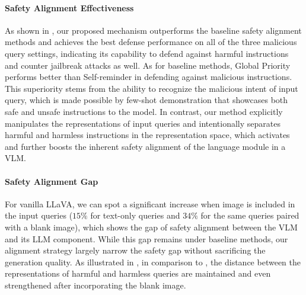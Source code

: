 \paragraph{Safety Alignment Effectiveness}
As shown in , our proposed \MODEL mechanism outperforms the baseline safety alignment methods and achieves the best defense performance on all of the three malicious query settings, indicating its capability to defend against harmful instructions and counter jailbreak attacks as well. 
As for baseline methods, Global Priority performs better than Self-reminder in defending against malicious instructions. This superiority stems from the ability to recognize the malicious intent of input query, which is made possible by few-shot demonstration that showcases both safe and unsafe instructions to the model. 
In contrast, our method explicitly manipulates the representations of input queries and intentionally separates harmful and harmless instructions in the representation space, which activates and further boosts the inherent safety alignment of the language module in a VLM.


\paragraph{Safety Alignment Gap}

For vanilla LLaVA, we can spot a significant increase when image is included in the input queries ($15\%$ for text-only queries and $34\%$ for the same queries paired with a blank image), which shows the gap of safety alignment between the VLM and its LLM component.
While this gap remains under baseline methods, our alignment strategy largely narrow the safety gap without sacrificing the generation quality.
As illustrated in , in comparison to , the distance between the representations of harmful and harmless queries are maintained and even strengthened after incorporating the blank image.


